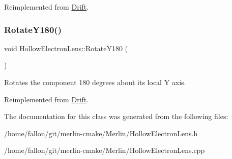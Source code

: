 Reimplemented from \hyperlink{classDrift_a9f3925549a0c7c99b39a1abea8546642}{Drift}.

\mbox{\label{classHollowElectronLens_a8e806750ac6f8129d3be4a089303da36}} 
\subsubsection{\texorpdfstring{Rotate\+Y180()}{RotateY180()}}
{\footnotesize\ttfamily void Hollow\+Electron\+Lens\+::\+Rotate\+Y180 (\begin{DoxyParamCaption}{ }\end{DoxyParamCaption})\hspace{0.3cm}{\ttfamily [virtual]}}

Rotates the component 180 degrees about its local Y axis. 

Reimplemented from \hyperlink{classDrift_abf387eddfcabfc81b186080f6301ce60}{Drift}.



The documentation for this class was generated from the following files\+:\begin{DoxyCompactItemize}
\item 
/home/fallon/git/merlin-\/cmake/\+Merlin/Hollow\+Electron\+Lens.\+h\item 
/home/fallon/git/merlin-\/cmake/\+Merlin/Hollow\+Electron\+Lens.\+cpp\end{DoxyCompactItemize}
